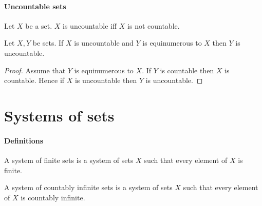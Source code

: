 \documentclass[../arithmetic.tex]{subfiles}
\begin{document}
  \paragraph{Uncountable sets}

  \begin{forthel}
    \begin{definition}
      Let $X$ be a set.
      $X$ is uncountable iff $X$ is not countable.
    \end{definition}
  \end{forthel}

  \begin{forthel}
    \begin{proposition}
      Let $X, Y$ be sets.
      If $X$ is uncountable and $Y$ is equinumerous to $X$ then $Y$ is
      uncountable.
    \end{proposition}
    \begin{proof}
      Assume that $Y$ is equinumerous to $X$.
      If $Y$ is countable then $X$ is countable.
      Hence if $X$ is uncountable then $Y$ is uncountable.
    \end{proof}
  \end{forthel}


  \section{Systems of sets}

  \paragraph{Definitions}

  \begin{forthel}
    \begin{definition}
      A system of finite sets is a system of sets $X$ such that every element of
      $X$ is finite.
    \end{definition}
  \end{forthel}

  \begin{forthel}
    \begin{definition}
      A system of countably infinite sets is a system of sets $X$ such that
      every element of $X$ is countably infinite.
    \end{definition}
  \end{forthel}
\end{document}
